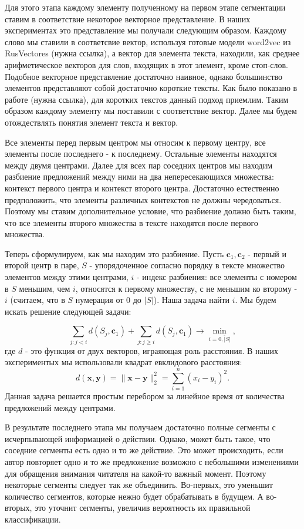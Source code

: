 \documentclass[12pt]{article}
\begin{document}
Для этого этапа каждому элементу полученному на первом этапе сегментации ставим в соответствие некоторое векторное представление. В наших экспериментах это представление мы получали следующим образом. Каждому слово мы ставили в соответсвие вектор, используя готовые модели word2vec из RusVectores (нужна ссылка), а вектор для элемента текста, находили, как среднее арифметическое векторов для слов, входящих в этот элемент, кроме стоп-слов. Подобное векторное представление достаточно наивное, однако большинство элементов представляют собой достаточно короткие тексты. Как было показано в работе (нужна ссылка), для коротких текстов данный подход приемлим. Таким образом каждому элементу мы поставили с соответствие вектор. Далее мы будем отождествлять понятия элемент текста и вектор.

Все элементы перед первым центром мы относим к первому центру, все элементы после последнего - к последнему. Остальные элементы находятся между двумя центрами. Далее для всех пар соседних центров мы находим разбиение предложений между ними на два непересекающихся множества: контекст первого центра и контекст второго центра. Достаточно естественно предположить, что элементы различных контекстов не должны чередоваться. Поэтому мы ставим дополнительное условие, что разбиение должно быть таким, что все элементы второго множества в тексте находятся после первого множества.

Теперь сформулируем, как мы находим это разбиение. Пусть $\textbf{c}_1, \textbf{c}_2$ - первый и второй центр в паре, $S$ - упорядоченное согласно порядку в тексте множество элементов между этими центрами, $i$ - индекс разбиения: все элементы с номером в $S$ меньшим, чем $i$, относятся к первому множеству, с не меньшим ко второму - $i$ (считаем, что в $S$ нумерация от 0 до $|S|$). Наша задача найти $i$. Мы будем искать решение следующей задачи:

$$\sum\limits_{j:j< i}d(S_j, \textbf{c}_1) + \sum\limits_{j:j\geq i}d(S_j, \textbf{c}_1) \rightarrow \min_{i=\overline{0,|S|}},$$
где $d$ - это функция от двух векторов, играяющая роль расстояния. В наших экспериментых мы использовали квадрат евклидового расстояния:
 $$d(\textbf{x}, \textbf{y}) = \|\textbf{x} - \textbf{y}\|_2^2 = \sum\limits_{i=1}^n(x_i-y_i)^2.$$
Данная задача решается простым перебором за линейное время от количества предложений между центрами.

В результате последнего этапа мы получаем достаточно полные сегменты с исчерпывающей информацией о действии. Однако, может быть такое, что соседние сегменты есть одно и то же действие. Это может происходить, если автор повторяет одно и то же предложение возможно с небольшими изменениями для обращения внимания читателя на какой-то важный момент. Поэтому некоторые сегменты следует так же объединить. Во-первых, это уменьшит количество сегментов, которые нежно будет обрабатывать в будущем. А во-вторых, это уточнит сегменты, увеличив вероятность их правильной классификации.
\end{document}
